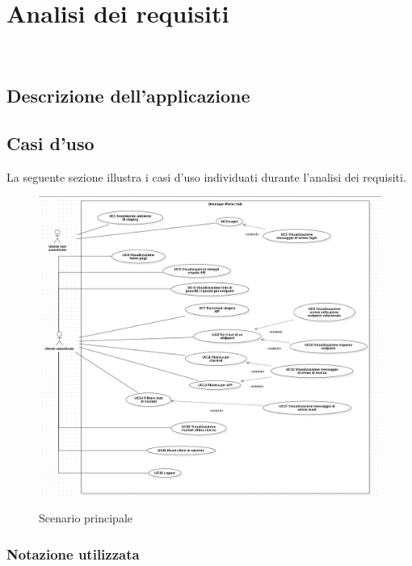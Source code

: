 \chapter{Analisi dei requisiti}
\label{cap:analisi-requisiti}

\\
 
\section{Descrizione dell'applicazione}

\section{Casi d'uso}\label{sec:usecase}

La seguente sezione illustra i casi d'uso individuati durante l'analisi dei requisiti. 
\begin{figure}[h] 
    \centering 
    \includegraphics[width=0.9\columnwidth, alt={Scenario principale dei casi d'uso individuati}]{images/usecase/scenario-principale.jpg}
    \caption{Scenario principale}\label{fig:usecase-scenario-principale}
\end{figure}

\clearpage

\subsection{Notazione utilizzata}

